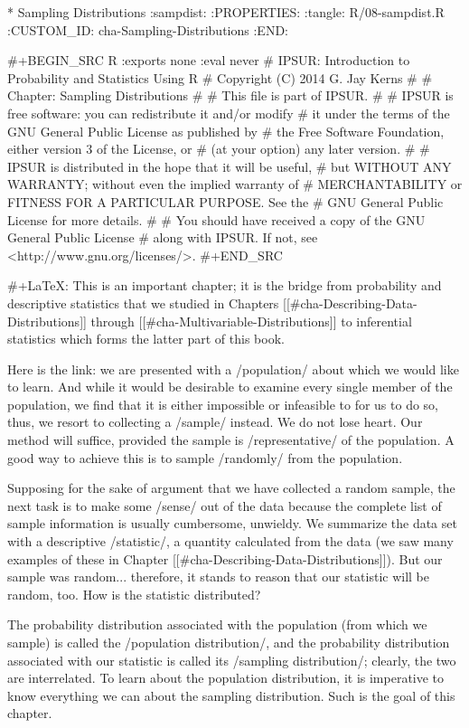 * Sampling Distributions                                           :sampdist:
:PROPERTIES:
:tangle: R/08-sampdist.R
:CUSTOM_ID: cha-Sampling-Distributions
:END:

#+BEGIN_SRC R :exports none :eval never
#    IPSUR: Introduction to Probability and Statistics Using R
#    Copyright (C) 2014  G. Jay Kerns
#
#    Chapter: Sampling Distributions
#
#    This file is part of IPSUR.
#
#    IPSUR is free software: you can redistribute it and/or modify
#    it under the terms of the GNU General Public License as published by
#    the Free Software Foundation, either version 3 of the License, or
#    (at your option) any later version.
#
#    IPSUR is distributed in the hope that it will be useful,
#    but WITHOUT ANY WARRANTY; without even the implied warranty of
#    MERCHANTABILITY or FITNESS FOR A PARTICULAR PURPOSE.  See the
#    GNU General Public License for more details.
#
#    You should have received a copy of the GNU General Public License
#    along with IPSUR.  If not, see <http://www.gnu.org/licenses/>.
#+END_SRC

#+LaTeX: \noindent 
This is an important chapter; it is the bridge from probability and
descriptive statistics that we studied in Chapters
[[#cha-Describing-Data-Distributions]] through
[[#cha-Multivariable-Distributions]] to inferential statistics which
forms the latter part of this book.

Here is the link: we are presented with a /population/ about which we
would like to learn. And while it would be desirable to examine every
single member of the population, we find that it is either impossible
or infeasible to for us to do so, thus, we resort to collecting a
/sample/ instead. We do not lose heart. Our method will suffice,
provided the sample is /representative/ of the population. A good way
to achieve this is to sample /randomly/ from the population.

Supposing for the sake of argument that we have collected a random
sample, the next task is to make some /sense/ out of the data because
the complete list of sample information is usually cumbersome,
unwieldy. We summarize the data set with a descriptive /statistic/, a
quantity calculated from the data (we saw many examples of these in
Chapter [[#cha-Describing-Data-Distributions]]). But our sample was
random... therefore, it stands to reason that our statistic will be
random, too. How is the statistic distributed?

The probability distribution associated with the population (from
which we sample) is called the /population distribution/, and the
probability distribution associated with our statistic is called its
/sampling distribution/; clearly, the two are interrelated. To learn
about the population distribution, it is imperative to know everything
we can about the sampling distribution. Such is the goal of this
chapter.

